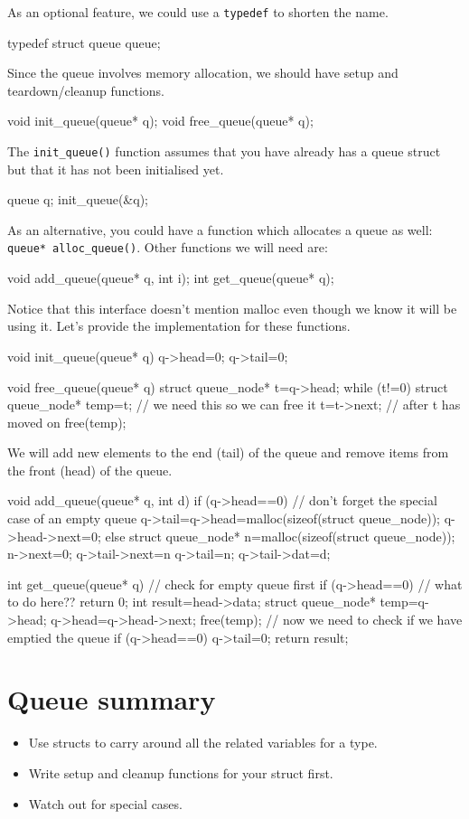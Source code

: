 As an optional feature, we could use a \texttt{typedef} to shorten the name.
\begin{codeblock}
typedef struct queue queue;
\end{codeblock}

Since the queue involves memory allocation, we should have setup and teardown/cleanup functions.
\begin{codeblock}
void init_queue(queue* q);
void free_queue(queue* q);
\end{codeblock}
The \lstinline!init_queue()! function assumes that you have already has a queue struct but that it has not been initialised yet.
\begin{codeblock}
queue q;
init_queue(&q);
\end{codeblock}

As an alternative, you could have a function which allocates a queue as well: \lstinline!queue* alloc_queue()!.
Other functions we will need are:
\begin{codeblock}
void add_queue(queue* q, int i);
int get_queue(queue* q);
\end{codeblock}

Notice that this interface doesn't mention malloc even though we know it will be using it.
Let's provide the implementation for these functions.
\begin{codeblock}
void init_queue(queue* q) {
    q->head=0;
    q->tail=0;
}

void free_queue(queue* q) {
    struct queue_node* t=q->head;
    while (t!=0) {
        struct queue_node* temp=t;	// we need this so we can free it
        t=t->next;			// after t has moved on
        free(temp);
    }
}
\end{codeblock}

We will add new elements to the end (tail) of the queue and remove items from the front (head) of the queue.
\begin{codeblock}
void add_queue(queue* q, int d) {
    if (q->head==0) {		// don't forget the special case of an empty queue
        q->tail=q->head=malloc(sizeof(struct queue_node));
        q->head->next=0;
    } else {
	struct queue_node* n=malloc(sizeof(struct queue_node));
	n->next=0;
	q->tail->next=n
	q->tail=n;
    }
    q->tail->dat=d;
}

int get_queue(queue* q) {
	// check for empty queue first
    if (q->head==0) {
	  // what to do here??
	return 0;
    }
    int result=head->data;
    struct queue_node* temp=q->head;
    q->head=q->head->next;
    free(temp);
      // now we need to check if we have emptied the queue
    if (q->head==0) {
        q->tail=0;
    }
    return result;
}

\end{codeblock}









\section*{Queue summary}
\begin{itemize}
 \item Use structs to carry around all the related variables for a type.
 \item Write setup and cleanup functions for your struct first.
 \item Watch out for special cases.
\end{itemize}
